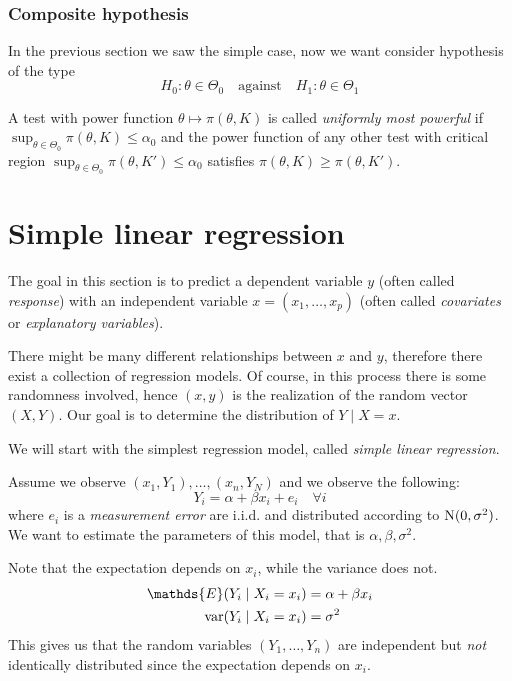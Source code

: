 \documentclass[12pt]{extarticle}
\renewcommand{\var}{{\operatorfont var}}
\newcommand{\E}{\mathds{E}}
\newcommand{\Normal}{{\operatorfont N}}
\begin{document}
\subsubsection{Composite hypothesis}
In the previous section we saw the simple case, now we want consider hypothesis of the type
\begin{equation}
    H_0: \theta \in \Theta_0 \quad \text{against} \quad H_1 : \theta \in \Theta_1
\end{equation}

A test with power function $\theta \mapsto \pi(\theta, K)$ is called \emph{uniformly most powerful}
if $\sup_{\theta \in \Theta_0} \pi(\theta, K) \leq \alpha_0$ and the power function of any other test
with critical region $\sup_{\theta \in \Theta_0} \pi(\theta, K') \leq \alpha_0$ satisfies
$\pi(\theta, K) \geq \pi(\theta, K')$.

\section{Simple linear regression}

The goal in this section is to predict a dependent variable $y$ (often called \emph{response})
with an independent variable $x = (x_1, \dots, x_p)$
(often called \emph{covariates} or \emph{explanatory variables}).

There might be many different relationships between $x$ and $y$,
therefore there exist a collection of regression models.
Of course, in this process there is some randomness involved, hence $(x, y)$
is the realization of the random vector $(X, Y)$.
Our goal is to determine the distribution of $Y \mid X = x$.

We will start with the simplest regression model, called \emph{simple linear regression}.

Assume we observe $(x_1, Y_1), \dots, (x_n, Y_N)$ and we observe the following:
\begin{equation}
    Y_i = \alpha + \beta x_i + e_i \quad \forall i
\end{equation}
where $e_i$ is a \emph{measurement error} are i.i.d. and distributed according to $\Normal(0, \sigma^2)$.
We want to estimate the parameters of this model, that is $\alpha, \beta, \sigma^2$.

Note that the expectation depends on $x_i$, while the variance does not.
\begin{align}
    \E(Y_i \mid X_i = x_i)   & = \alpha + \beta x_i \\
    \var(Y_i \mid X_i = x_i) & = \sigma^2
\end{align}
This gives us that the random variables $(Y_1, \dots, Y_n)$ are independent
but \emph{not} identically distributed since the expectation depends on $x_i$.
\end{document}
